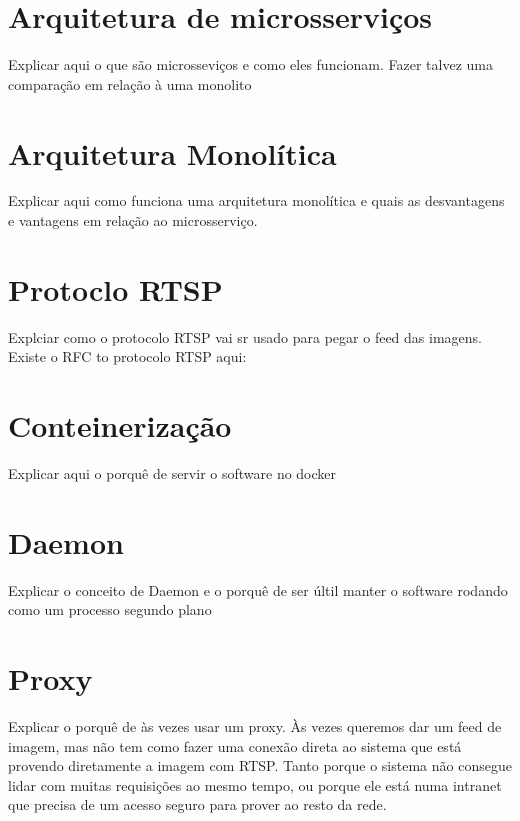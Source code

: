 \documentclass[12pt, %
openright, 
oneside, %
a4paper,    %
brazil]{facom-ufu-abntex2}
\begin{document}
\section{Arquitetura de microsserviços}

Explicar aqui o que são microsseviços e como eles funcionam. Fazer talvez uma
comparação em relação à uma monolito

\section{Arquitetura Monolítica}

Explicar aqui como funciona uma arquitetura monolítica e quais as desvantagens
e vantagens em relação ao microsserviço.

\section{Protoclo RTSP}

Explciar como o protocolo RTSP vai sr usado para pegar o feed das imagens.
Existe o RFC to protocolo RTSP aqui:

\section{Conteinerização}

Explicar aqui o porquê de servir o software no docker

\section{Daemon}

Explicar o conceito de Daemon e o porquê de ser últil manter o software rodando
como um processo segundo plano

\section{Proxy}

Explicar o porquê de às vezes usar um proxy. Às vezes queremos dar um feed de
imagem, mas não tem como fazer uma conexão direta ao sistema que está provendo
diretamente a imagem com RTSP. Tanto porque o sistema não consegue lidar com
muitas requisições ao mesmo tempo, ou porque ele está numa intranet que precisa
de um acesso seguro para prover ao resto da rede.
\end{document}
